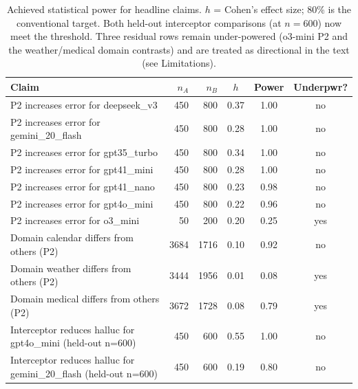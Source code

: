 \begin{table}[t]
\centering\small
\caption{Achieved statistical power for headline claims. $h$ = Cohen's effect size; 80\% is the conventional target. Both held-out interceptor comparisons (at $n\!=\!600$) now meet the threshold. Three residual rows remain under-powered (o3-mini P2 and the weather/medical domain contrasts) and are treated as directional in the text (see Limitations).}
\label{tab:power}
\begin{tabular}{p{5cm}rrccc}
\toprule
Claim & $n_A$ & $n_B$ & $h$ & Power & Underpwr? \\
\midrule
P2 increases error for deepseek\_v3 & 450 & 800 & 0.37 & 1.00 & no \\
P2 increases error for gemini\_20\_flash & 450 & 800 & 0.28 & 1.00 & no \\
P2 increases error for gpt35\_turbo & 450 & 800 & 0.34 & 1.00 & no \\
P2 increases error for gpt41\_mini & 450 & 800 & 0.28 & 1.00 & no \\
P2 increases error for gpt41\_nano & 450 & 800 & 0.23 & 0.98 & no \\
P2 increases error for gpt4o\_mini & 450 & 800 & 0.22 & 0.96 & no \\
P2 increases error for o3\_mini & 50 & 200 & 0.20 & 0.25 & yes \\
Domain calendar differs from others (P2) & 3684 & 1716 & 0.10 & 0.92 & no \\
Domain weather differs from others (P2) & 3444 & 1956 & 0.01 & 0.08 & yes \\
Domain medical differs from others (P2) & 3672 & 1728 & 0.08 & 0.79 & yes \\
Interceptor reduces halluc for gpt4o\_mini (held-out n=600) & 450 & 600 & 0.55 & 1.00 & no \\
Interceptor reduces halluc for gemini\_20\_flash (held-out n=600) & 450 & 600 & 0.19 & 0.80 & no \\
\bottomrule
\end{tabular}
\end{table}